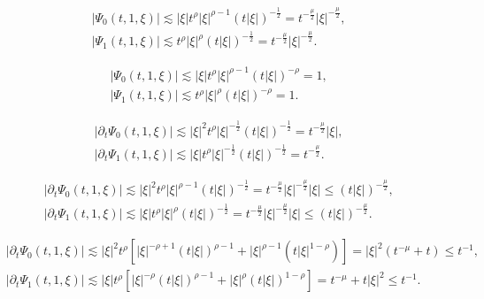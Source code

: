 \documentclass[10pt,a4paper]{amsart}
\newcommand{\f}{\frac}
\newcommand{\p}{\partial}
\begin{document}
\begin{equation}\label{equ:q28}
\begin{aligned}
& \left|\Psi_0(t, 1,\xi)\right| \lesssim|\xi| t^\rho|\xi|^{\rho-1}(t|\xi|)^{-\frac{1}{2}}=t^{-\frac{\mu}{2}}|\xi|^{-\frac{\mu}{2}} ,\\
& \left|\Psi_1(t, 1, \xi)\right|  \lesssim t^\rho|\xi|^{\rho}(t|\xi|)^{-\frac{1}{2}}=t^{-\frac{\mu}{2}}|\xi|^{-\frac{\mu}{2}}.
\end{aligned}
\end{equation}

\begin{equation}\label{equ:q26}
\begin{aligned}
& \left|\Psi_0(t, 1,\xi)\right| \lesssim|\xi| t^\rho|\xi|^{\rho-1}(t|\xi|)^{-\rho}=1, \\
& \left|\Psi_1(t, 1, \xi)\right|  \lesssim t^\rho|\xi|^{\rho}(t|\xi|)^{-\rho}=1.
\end{aligned}
\end{equation}

\begin{equation}\label{equ:q32}
\begin{aligned}
& \left|\p_t\Psi_0(t, 1,\xi)\right| \lesssim|\xi|^2 t^\rho|\xi|^{-\frac{1}{2}}(t|\xi|)^{-\frac{1}{2}}=t^{-\frac{\mu}{2}}|\xi|, \\
& \left|\p_t\Psi_1(t, 1, \xi)\right|  \lesssim |\xi|t^\rho|\xi|^{-\frac{1}{2}}(t|\xi|)^{-\frac{1}{2}}=t^{-\frac{\mu}{2}}.
\end{aligned}
\end{equation}

\begin{equation}\label{equ:q36}
\begin{aligned}
& \left|\p_t\Psi_0(t, 1,\xi)\right| \lesssim|\xi|^2 t^\rho|\xi|^{\rho-1}(t|\xi|)^{-\frac{1}{2}}=t^{-\frac{\mu}{2}}|\xi|^{-\frac{\mu}{2}}|\xi|\leq (t|\xi|)^{-\f{\mu}{2}}, \\
& \left|\p_t\Psi_1(t, 1, \xi)\right|  \lesssim |\xi|t^\rho|\xi|^{\rho}(t|\xi|)^{-\frac{1}{2}}=t^{-\frac{\mu}{2}}|\xi|^{-\frac{\mu}{2}}|\xi|\leq(t|\xi|)^{-\f{\mu}{2}}.
\end{aligned}
\end{equation}

\begin{equation}\label{equ:q39}
\begin{aligned}
& \left|\p_t\Psi_0(t, 1,\xi)\right| \lesssim|\xi|^2 t^\rho[|\xi|^{-\rho+1}(t|\xi|)^{\rho-1}+|\xi|^{\rho-1}(t|\xi|^{1-\rho})]=|\xi|^2(t^{-\mu}+t)\leq t^{-1}, \\
& \left|\p_t\Psi_1(t, 1, \xi)\right|  \lesssim |\xi|t^\rho[|\xi|^{-\rho}(t|\xi|)^{\rho-1}+|\xi|^{\rho}(t|\xi|)^{1-\rho}]=
t^{-\mu}+t|\xi|^2\leq t^{-1}.
\end{aligned}
\end{equation}
\end{document}
